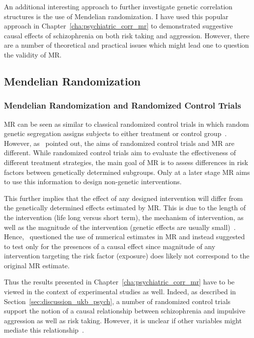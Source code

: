 An additional interesting approach to further investigate genetic correlation structures is the use of Mendelian randomization.
I have used this popular approach in Chapter~\ref{cha:psychiatric_corr_mr} to demonstrated suggestive causal effects of schizophrenia on both risk taking and aggression.
However, there are a number of theoretical and practical issues which might lead one to question the validity of MR\@.

\subsection{Mendelian Randomization}
\label{sub:mendelian_randomization_discussion}

\subsubsection{Mendelian Randomization and Randomized Control Trials}
\label{ssub:causality_and_mendelian_randomization}

MR can be seen as similar to classical randomized control trials in which random genetic segregation  assigns subjects to either treatment or control group~\cite{Hingorani2005}.
However, as~\citet{Burgess2016a} pointed out, the aims of randomized control trials and MR are different.
While randomized control trials aim to evaluate the effectiveness of different treatment strategies, the main goal of MR is to assess differences in risk factors between genetically determined subgroups. Only at a later stage MR aims to use this information to design non-genetic interventions.

This further implies that the effect of any designed intervention will differ from the genetically determined effects estimated by MR\@.
This is due to the length of the intervention (life long versus short term), the mechanism of intervention, as well as the magnitude of the intervention (genetic effects are usually small)~\cite{Evans2015}. 
Hence,~\citet{Vanderweele2015} questioned the use of  numerical estimates in MR and instead suggested to test only for the presences of a causal effect since magnitude of any intervention targeting the risk factor (exposure) does likely not correspond to the original MR estimate.

Thus the results presented in Chapter~\ref{cha:psychiatric_corr_mr} have to be viewed in the context of experimental studies as well.
Indeed, as described in Section~\ref{sec:discussion_ukb_psych}, a number of randomized control trials support the notion of a causal relationship between schizophrenia and impulsive aggression as well as risk taking. 
However, it is unclear if other variables might mediate this relationship~\cite{Evans2015}.

